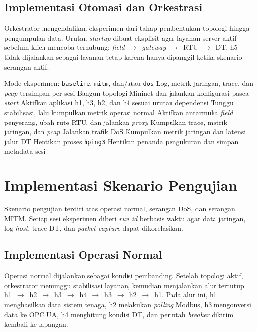 \subsection{Implementasi Otomasi dan Orkestrasi}
\label{subsec:implementasi_otomasi_dan_orkestrasi}
Orkestrator mengendalikan eksperimen dari tahap pembentukan topologi hingga pengumpulan data. Urutan \textit{startup} dibuat eksplisit agar layanan server aktif sebelum klien mencoba terhubung: \textit{field}~$\rightarrow$~\textit{gateway}~$\rightarrow$~RTU~$\rightarrow$~\ac{DT}. h5 tidak dijalankan sebagai layanan tetap karena hanya dipanggil ketika skenario serangan aktif.

\begin{algorithm}[H]
\caption{Alur orkestrasi eksperimen}
\begin{compactalgorithmic}[1]
\Require Mode eksperimen: \texttt{baseline}, \texttt{mitm}, dan/atau \texttt{dos}
\Ensure Log, metrik jaringan, trace, dan \textit{pcap} tersimpan per sesi
\State Bangun topologi Mininet dan jalankan konfigurasi pasca-\textit{start}
\State Aktifkan aplikasi h1, h3, h2, dan h4 sesuai urutan dependensi
    \State Tunggu stabilisasi, lalu kumpulkan metrik operasi normal
\EndIf
{}
    \State Aktifkan antarmuka \textit{field} penyerang, ubah rute RTU, dan jalankan \textit{proxy}
    \State Kumpulkan trace, metrik jaringan, dan \textit{pcap}
\EndIf
{}
        \State Jalankan trafik \ac{DoS}
        \State Kumpulkan metrik jaringan dan latensi jalur \ac{DT}
        \State Hentikan proses \texttt{hping3}
    \EndFor
\EndIf
\State Hentikan penanda pengukuran dan simpan metadata sesi
\end{compactalgorithmic}
\end{algorithm}

\section{Implementasi Skenario Pengujian}
\label{sec:implementasi_skenario_serangan}
Skenario pengujian terdiri atas operasi normal, serangan \ac{DoS}, dan serangan \ac{MITM}. Setiap sesi eksperimen diberi \textit{run id} berbasis waktu agar data jaringan, log \textit{host}, trace \ac{DT}, dan \textit{packet capture} dapat dikorelasikan.

\subsection{Implementasi Operasi Normal}
\label{subsec:skenario_operasi_normal}
Operasi normal dijalankan sebagai kondisi pembanding. Setelah topologi aktif, orkestrator menunggu stabilisasi layanan, kemudian menjalankan alur tertutup h1~$\rightarrow$~h2~$\rightarrow$~h3~$\rightarrow$~h4~$\rightarrow$~h3~$\rightarrow$~h2~$\rightarrow$~h1. Pada alur ini, h1 menghasilkan data sistem tenaga, h2 melakukan \textit{polling} Modbus, h3 mengonversi data ke OPC UA, h4 menghitung kondisi \ac{DT}, dan perintah \textit{breaker} dikirim kembali ke lapangan.

